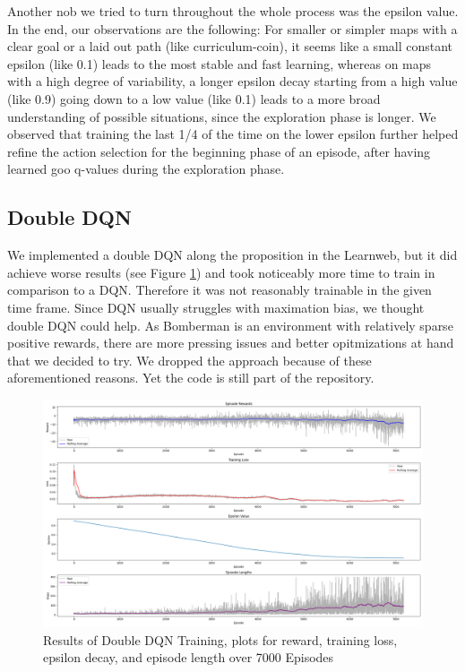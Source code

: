 \documentclass{article} %
\begin{document}
	Another nob we tried to turn throughout the whole process was the epsilon value. In the end, our observations are the following: For smaller or simpler maps with a clear goal or a laid out path (like curriculum-coin), it seems like a small constant epsilon (like 0.1) leads to the most stable and fast learning, whereas on maps with a high degree of variability, a longer epsilon decay starting from a high value (like 0.9) going down to a low value (like 0.1) leads to a more broad understanding of possible situations, since the exploration phase is longer. We observed that training the last 1/4 of the time on the lower epsilon further helped refine the action selection for the beginning phase of an episode, after having learned goo q-values during the exploration phase.
	
	\subsection{Double DQN}
	We implemented a double DQN along the proposition in the Learnweb, but it did achieve worse results (see Figure \ref{fig:2}) and took noticeably more time to train in comparison to a DQN. Therefore it was not reasonably trainable in the given time frame. Since DQN usually struggles with maximation bias, we thought double DQN could help. As Bomberman is an environment with relatively sparse positive rewards, there are more pressing issues and better opitmizations at hand that we decided to try. 
	We dropped the approach because of these aforementioned reasons. Yet the code is still part of the repository.
	
	\begin{figure}[h!]
		\centering
		\includegraphics[width=1.0\textwidth]{images/double_dqn_results}
		\caption{Results of Double DQN Training, plots for reward, training loss, epsilon decay, and episode length over 7000 Episodes}
		\label{fig:2}
	\end{figure}
	
\end{document}
